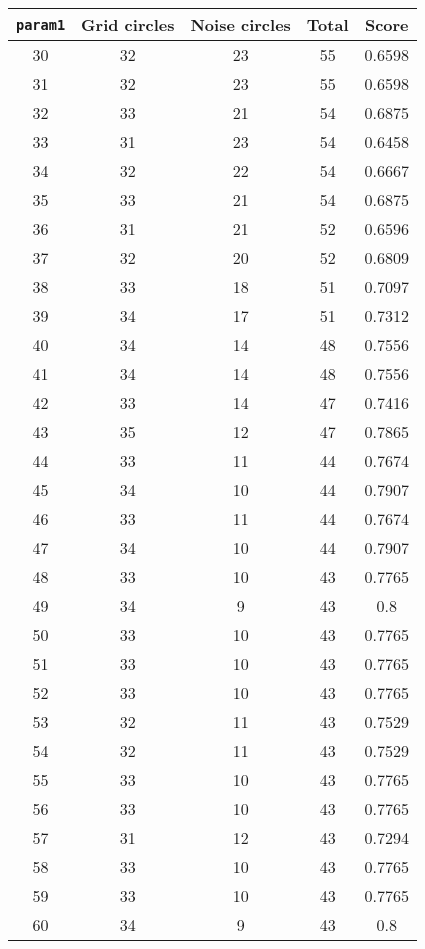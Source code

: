 \documentclass[letterpaper, 12pt]{article}
\begin{document}
\begin{longtable}{|c|c|c|c|c|}
\hline
\textbf{\texttt{param1}} & \textbf{Grid circles} & \textbf{Noise circles} & \textbf{Total} & \textbf{Score} \\
\hline
30 & 32 & 23 & 55 & 0.6598 \\
\hline
31 & 32 & 23 & 55 & 0.6598 \\
\hline
32 & 33 & 21 & 54 & 0.6875 \\
\hline
33 & 31 & 23 & 54 & 0.6458 \\
\hline
34 & 32 & 22 & 54 & 0.6667 \\
\hline
35 & 33 & 21 & 54 & 0.6875 \\
\hline
36 & 31 & 21 & 52 & 0.6596 \\
\hline
37 & 32 & 20 & 52 & 0.6809 \\
\hline
38 & 33 & 18 & 51 & 0.7097 \\
\hline
39 & 34 & 17 & 51 & 0.7312 \\
\hline
40 & 34 & 14 & 48 & 0.7556 \\
\hline
41 & 34 & 14 & 48 & 0.7556 \\
\hline
42 & 33 & 14 & 47 & 0.7416 \\
\hline
43 & 35 & 12 & 47 & 0.7865 \\
\hline
44 & 33 & 11 & 44 & 0.7674 \\
\hline
45 & 34 & 10 & 44 & 0.7907 \\
\hline
46 & 33 & 11 & 44 & 0.7674 \\
\hline
47 & 34 & 10 & 44 & 0.7907 \\
\hline
48 & 33 & 10 & 43 & 0.7765 \\
\hline
49 & 34 & 9 & 43 & 0.8 \\
\hline
50 & 33 & 10 & 43 & 0.7765 \\
\hline
51 & 33 & 10 & 43 & 0.7765 \\
\hline
52 & 33 & 10 & 43 & 0.7765 \\
\hline
53 & 32 & 11 & 43 & 0.7529 \\
\hline
54 & 32 & 11 & 43 & 0.7529 \\
\hline
55 & 33 & 10 & 43 & 0.7765 \\
\hline
56 & 33 & 10 & 43 & 0.7765 \\
\hline
57 & 31 & 12 & 43 & 0.7294 \\
\hline
58 & 33 & 10 & 43 & 0.7765 \\
\hline
59 & 33 & 10 & 43 & 0.7765 \\
\hline
60 & 34 & 9 & 43 & 0.8 \\

\end{longtable}
\end{document}
